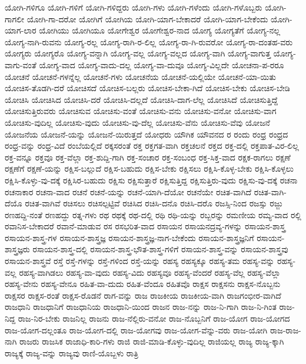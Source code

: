 {ಯೋಗಿ-ಗಳಿಗೂ
ಯೋಗಿ-ಗಳಿಗೆ
ಯೋಗಿ-ಗಳಿದ್ದರು
ಯೋಗಿ-ಗಳು
ಯೋಗಿ-ಗಳೆಂದು
ಯೋಗಿ-ಗಳೊಬ್ಬರು
ಯೋಗಿ-ಗಾಗಲೀ
ಯೋಗಿ-ಗಾ-ದರೋ
ಯೋಗಿಗೆ
ಯೋಗಿಯ
ಯೋಗಿ-ಯಾಗ-ಬೇಕಾದರೆ
ಯೋಗಿ-ಯಾಗ-ಬೇಕೆಂದು
ಯೋಗಿ-ಯಾಗ-ಲಾರ
ಯೋಗಿಯು
ಯೋಗಿಯೂ
ಯೋಗೇಶ್ವರ
ಯೋಗೇಶ್ವರ-ನಾದ
ಯೋಗ್ಯ
ಯೋಗ್ಯತೆಗೆ
ಯೋಗ್ಯ-ನಲ್ಲ
ಯೋಗ್ಯ-ನಾಗಿ-ರುವನು
ಯೋಗ್ಯ-ರಲ್ಲ
ಯೋಗ್ಯ-ರಾಗಿ-ರ-ಲಿಲ್ಲ
ಯೋಗ್ಯ-ರಾ-ಗಿ-ರುವರೋ
ಯೋಗ್ಯ-ರಾ-ದಂತಹ-ವರು
ಯೋಗ್ಯರು
ಯೋಗ್ಯರೊ
ಯೋಗ್ಯ-ವನ್ನಾಗಿ
ಯೋಗ್ಯ-ವಲ್ಲ
ಯೋಗ್ಯ-ವಲ್ಲದ
ಯೋಗ್ಯ-ವಾಗಿ
ಯೋಗ್ಯ-ವಾಗುತ್ತ
ಯೋಗ್ಯ-ವಾಗು-ವಂತೆ
ಯೋಗ್ಯ-ವಾದ
ಯೋಗ್ಯ-ವಾದು-ದಲ್ಲ
ಯೋಗ್ಯ-ವಾ-ದುವೂ
ಯೋಗ್ಯ-ವಿಲ್ಲದೇ
ಯೋಚನಾ-ಪ-ರರೂ
ಯೋಚನೆ
ಯೋಚನೆ-ಗಳನ್ನೆಲ್ಲ
ಯೋಚನೆ-ಗಳು
ಯೋಚನೆಯ
ಯೋಚನೆ-ಯಲ್ಲಿಯೇ
ಯೋಚನೆ-ಯಾ-ಯಿತು
ಯೋಚಿಸ-ತೊಡಗಿ-ದರೆ
ಯೋಚಿಸದೆ
ಯೋಚಿಸ-ಬಲ್ಲರು
ಯೋಚಿಸ-ಬೇಕಾ-ಗಿದೆ
ಯೋಚಿಸ-ಬೇಕು
ಯೋಚಿಸ-ಬೇಡಿ
ಯೋಚಿಸಿ
ಯೋಚಿಸಿದ
ಯೋಚಿಸಿ-ದರೆ
ಯೋಚಿಸಿ-ದಲ್ಲದೆ
ಯೋಚಿಸಿ-ದಾಗ-ಲೆಲ್ಲ
ಯೋಚಿಸಿದೆ
ಯೋಚಿಸುತ್ತಿದ್ದೆ
ಯೋಚಿಸುತ್ತಿರುವರು
ಯೋಚಿಸುವ
ಯೋಚಿಸು-ವಂತೆ
ಯೋಚಿಸು-ವನು
ಯೋಚಿಸು-ವನೋ
ಯೋಚಿಸು-ವಾಗ
ಯೋಚಿಸು-ವುದಿಲ್ಲ
ಯೋಚಿಸು-ವುದು
ಯೋಚಿಸು-ವು-ದೆಲ್ಲ
ಯೋಚಿಸು-ವೆನು
ಯೋಚಿಸು-ವೆವು
ಯೋಜನೆ
ಯೋಜನೆಯ
ಯೋಜನೆ-ಯನ್ನು
ಯೋಜನೆ-ಯಿರುತ್ತದೆ
ಯೋಧರು
ಯೌಗಿಕ
ಯೌವನದ
ರ
ರಂದು
ರಂಧ್ರ
ರಂಧ್ರದ
ರಂಧ್ರ-ವನ್ನು
ರಂಧ್ರ-ವಿದೆ
ರಂಬೆಯಲ್ಲಿದೆ
ರಕ್ಕಸರಂತೆ
ರಕ್ತ
ರಕ್ತಗತ-ವಾಗಿ
ರಕ್ತಚಲನೆ
ರಕ್ತದ
ರಕ್ತ-ದಲ್ಲಿ
ರಕ್ತಪಾತ-ವಿರ-ಲಿಲ್ಲ
ರಕ್ತ-ವನ್ನೂ
ರಕ್ತವೂ
ರಕ್ತ-ವೆಲ್ಲಾ
ರಕ್ತ-ಶುದ್ದಿ-ಗಾಗಿ
ರಕ್ತ-ಸಂಚಾರ
ರಕ್ತ-ಸಂಬಂಧ
ರಕ್ತ-ಸಿಕ್ತ-ವಾದ
ರಕ್ಷಕ-ರಾಗಲು
ರಕ್ಷಣೆ
ರಕ್ಷಣೆಗೆ
ರಕ್ಷಣೆ-ಯನ್ನು
ರಕ್ಷಿಸ-ಬಲ್ಲುದೆ
ರಕ್ಷಿಸ-ಬಹುದು
ರಕ್ಷಿಸ-ಬೇಕು
ರಕ್ಷಿಸಲು
ರಕ್ಷಿಸಿ-ಕೊಳ್ಳ-ಬೇಕು
ರಕ್ಷಿಸಿ-ಕೊಳ್ಳಲು
ರಕ್ಷಿಸಿ-ಕೊಳ್ಳು-ವು-ದಕ್ಕೆ
ರಕ್ಷಿಸಿರ-ಬಹುದು
ರಕ್ಷಿಸು
ರಕ್ಷಿಸುತ್ತಾರೆ
ರಕ್ಷಿಸುತ್ತಿದ್ದ
ರಕ್ಷಿಸುತ್ತಿರು-ವುದು
ರಕ್ಷಿಸು-ವು-ದಕ್ಕೆ
ರಚನಾ
ರಚನಾಕಾರ
ರಚನಾ-ವಾದ
ರಚನೆ
ರಚನೆ-ಯನ್ನು
ರಚನೆ-ಯಾಗಿ-ದೆಯೋ
ರಚನೆಯೇ
ರಚಿತ-ವಾಗಿದೆ
ರಚಿತ-ವಾಗಿ-ದೆಯೊ
ರಚಿತ-ವಾಗಿವೆ
ರಚಿಸಲು
ರಚಿಸಲ್ಪಟ್ಟಿವೆ
ರಚಿಸಿದ
ರಚಿಸಿ-ದನೊ
ರಚಿಸಿ-ದರೊ
ರಜಸ್ಸಿ-ನಿಂದ
ರಜಸ್ಸು
ರಜ್ಜು
ರಣಹದ್ದಿ-ನಂತೆ
ರಣಹದ್ದು
ರತ್ನ-ಗಳು
ರಥ
ರಥಕ್ಕೆ
ರಥ-ದಲ್ಲಿ
ರಥಿ
ರಥಿ-ಯನ್ನು
ರಬ್ಬರನ್ನು
ರಮಣೀಯ
ರಮ್ಯ-ವಾದ
ರಲ್ಲಿ
ರವಾನಿಸ-ಬೇಕಾದರೆ
ರವಾನೆ-ಮಾಡುವ
ರಸ
ರಸಭರಿತ-ವಾದ
ರಸಾಯನ
ರಸಾಯನದ್ರವ್ಯ-ಗಳನ್ನು
ರಸಾಯನ-ಶಾಸ್ತ್ರ
ರಸಾಯನ-ಶಾಸ್ತ್ರ-ಗಳ
ರಸಾಯನ-ಶಾಸ್ತ್ರಜ್ಞ
ರಸಾಯನ-ಶಾಸ್ತ್ರಜ್ಞ-ನಾಗ-ಬೇಕೆಂದು
ರಸಾಯನ-ಶಾಸ್ತ್ರಜ್ಞನಿಗೆ
ರಸಾಯನ-ಶಾಸ್ತ್ರಜ್ಞರು
ರಸಾಯನ-ಶಾಸ್ತ್ರ-ದಲ್ಲಿ
ರಸಾಯನ-ಶಾಸ್ತ್ರ-ಭೌತ-ಶಾಸ್ತ್ರ-ಗಳಿಗೆ
ರಸಾಯನ-ಶಾಸ್ತ್ರ-ವನ್ನು
ರಸಾಯನ-ಶಾಸ್ತ್ರವು
ರಸಾಯನ-ಶಾಸ್ತ್ರವೆ
ರಸ್ತೆ
ರಸ್ತೆ-ಗಳನ್ನು
ರಸ್ತೆ-ಗಳಿಂದ
ರಸ್ತೆ-ಯನ್ನು
ರಹಸ್ಯ
ರಹಸ್ಯಕ್ಕೂ
ರಹಸ್ಯ-ತಮ
ರಹಸ್ಯ-ವನ್ನು
ರಹಸ್ಯ-ವಲ್ಲ
ರಹಸ್ಯ-ವಾಗಿಡಲು
ರಹಸ್ಯ-ವಾ-ವುದು
ರಹಸ್ಯ-ವಿದು
ರಹಸ್ಯವೂ
ರಹಸ್ಯ-ವೆಂದರೆ
ರಹಸ್ಯ-ವೆಲ್ಲ
ರಹಸ್ಯ-ವೆಲ್ಲಾ
ರಹಸ್ಯ-ವೇನು
ರಹಸ್ಯ-ವೇನೂ
ರಹಿತ-ವಾ-ದುದು
ರಹಿತ-ವೆಂದೂ
ರಹಿತವೊ
ರಾಕ್ಷಸ
ರಾಕ್ಷಸನು
ರಾಕ್ಷಸ-ನೊಬ್ಬನು
ರಾಕ್ಷಸರ
ರಾಕ್ಷಸ-ರಂತೆ
ರಾಕ್ಷಸ-ರೊಡನೆ
ರಾಗ-ವನ್ನು
ರಾಜ
ರಾಜಕೀಯ
ರಾಜಕೀಯ-ವಾಗಿ
ರಾಜಗಂಭೀರ-ವಾಗಿದೆ
ರಾಜಧಾನಿ
ರಾಜಧಾನಿಗೆ
ರಾಜಧಾನಿಯ
ರಾಜಧಾನಿ-ಯಿಂದ
ರಾಜನ
ರಾಜ-ನನ್ನು
ರಾಜ-ನಿ-ಗಾಗಿ
ರಾಜ-ನಿ-ಗಿಂತ
ರಾಜ-ನಿದ್ದ
ರಾಜ-ನಿರ-ಬೇಕು
ರಾಜನಿಲ್ಲ
ರಾಜನು
ರಾಜ-ನೆಲ್ಲಿರು-ವನೋ
ರಾಜ-ನೊಬ್ಬನಿಗೆ
ರಾಜ-ಯೋಗ
ರಾಜ-ಯೋಗದ
ರಾಜ-ಯೋಗ-ದಲ್ಲಂತೂ
ರಾಜ-ಯೋಗ-ದಲ್ಲಿ
ರಾಜ-ಯೋಗವು
ರಾಜ-ಯೋಗ-ವೆನ್ನು-ವರು
ರಾಜ-ಯೋಗಿ
ರಾಜ-ರಾಜ-ನಾಗಿ
ರಾಜರು
ರಾಜಸಿಕ
ರಾಜಾಧಿ-ಕಾರಿ-ಗಳು
ರಾಜಿ
ರಾಜಿ-ಮಾಡಿ-ಕೊಳ್ಳು-ವುದಿಲ್ಲ
ರಾಜಿಯಲ್ಲ
ರಾಜ್ಯ
ರಾಜ್ಯ-ಕ್ಕಾಗಿ
ರಾಜ್ಯಕ್ಕೆ
ರಾಜ್ಯ-ವನ್ನು
ರಾಜ್ಯವು
ರಾಣಿ-ಯೊಬ್ಬಳು
ರಾತ್ರಿ
}
